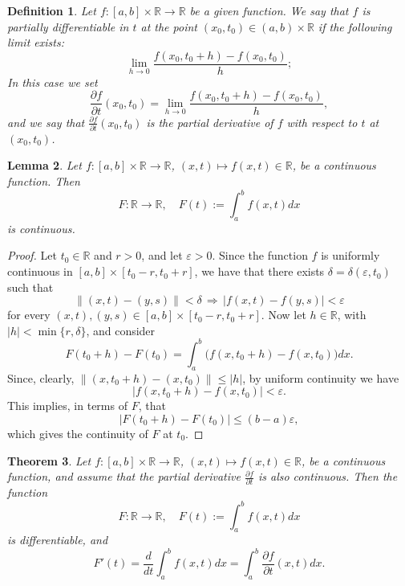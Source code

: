 \documentclass[a4paper,reqno]{amsart}
\numberwithin{equation}{section}
\newtheorem{definition}{Definition}[section]
\newtheorem{lemma}[definition]{Lemma}
\newtheorem{theorem}[definition]{Theorem}
\def\R{\mathbb{R}}
\begin{document}
\begin{definition}
Let $f:[a,b]\times \R \to \R$ be a given function. We say that $f$ is partially differentiable in $t$ at the point $(x_0,t_0)\in (a,b)\times \R$ if the following limit exists:
$$
\lim_{h\to 0} \frac{f(x_0,t_0+h) - f(x_0,t_0)}{h};
$$
In this case we set
$$
\frac{\partial f}{\partial t} (x_0,t_0) = \lim_{h\to 0} \frac{f(x_0,t_0+h) - f(x_0,t_0)}{h},
$$
and we say that $\frac{\partial f}{\partial t} (x_0,t_0)$ is the partial derivative of $f$ with respect to $t$ at $(x_0,t_0)$.

\end{definition}

\begin{lemma}
Let $f: [a,b]\times \R \to \R$, $(x,t)\mapsto f(x,t)\in \R$, be a continuous function. Then
$$
F:\R\to \R, \quad F(t):= \int_a^b f(x,t) dx
$$
is continuous.
\end{lemma}

\begin{proof}
Let $t_0\in \R$ and $r>0$, and let $\varepsilon>0$. Since the function $f$ is uniformly continuous in $[a,b]\times [t_0-r, t_0+r]$, we have that there exists $\delta=\delta(\varepsilon,t_0)$ such that
$$
\|(x,t)-(y,s)\|<\delta \, \Rightarrow \, |f(x,t)-f(y,s)|<\varepsilon
$$
for every $(x,t),(y,s) \in [a,b]\times [t_0-r, t_0+r]$. Now let $h\in \R$, with $|h|<\min\{r,\delta\}$, and consider
$$
F(t_0+h) - F(t_0) = \int_a^b \big(f(x,t_0+h) - f(x,t_0)\big) dx.
$$
Since, clearly, $\|(x,t_0+h) - (x,t_0)\| \leq |h|$, by uniform continuity we have
$$
|f(x,t_0+h) - f(x,t_0)|<\varepsilon.
$$
This implies, in terms of $F$, that
$$
|F(t_0+h)-F(t_0)| \leq (b-a) \varepsilon,
$$
which gives the continuity of $F$ at $t_0$.
\end{proof}

\begin{theorem}
Let $f: [a,b]\times \R \to \R$, $(x,t)\mapsto f(x,t)\in \R$, be a continuous function, and assume that the partial derivative
$\frac{\partial f}{\partial t}$ is also continuous. Then the function
$$
F:\R\to \R, \quad F(t):= \int_a^b f(x,t) dx
$$
is differentiable, and
$$
F'(t) = \frac{d}{dt}  \int_a^b f(x,t) dx =  \int_a^b \frac{\partial f}{\partial t}(x,t) dx.
$$
\end{theorem}
\end{document}
